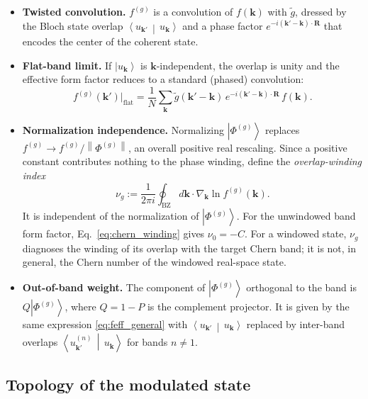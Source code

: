 \documentclass[aps,prb,onecolumn,nofootinbib,superscriptaddress]{revtex4-2}
\newcommand{\mbf}[1]{\mathbf{#1}}
\newcommand{\ket}[1]{\left|#1\right\rangle}
\newcommand{\braket}[2]{\left\langle#1\,\middle|\,#2\right\rangle}
\newcommand{\norm}[1]{\left\lVert#1\right\rVert}
\begin{document}
\begin{itemize}
\item \textbf{Twisted convolution.} $f^{(g)}$ is a convolution of $f(\mbf{k})$ with $\tilde{g}$, dressed by the Bloch state overlap $\braket{u_{\mbf{k}'}}{u_{\mbf{k}}}$ and a phase factor $e^{-i(\mbf{k}'-\mbf{k})\cdot\mbf{R}}$ that encodes the center of the coherent state.

\item \textbf{Flat-band limit.} If $\ket{u_{\mbf{k}}}$ is $\mbf{k}$-independent, the overlap is unity and the effective form factor reduces to a standard (phased) convolution:
\begin{equation}\label{eq:flat_band}
f^{(g)}(\mbf{k}') \big|_{\text{flat}} = \frac{1}{N}\sum_{\mbf{k}} \tilde{g}(\mbf{k}'-\mbf{k})\, e^{-i(\mbf{k}'-\mbf{k})\cdot\mbf{R}}\, f(\mbf{k}).
\end{equation}

\item \textbf{Normalization independence.} Normalizing $\ket{\Phi^{(g)}}$ replaces $f^{(g)} \to f^{(g)}/\norm{\Phi^{(g)}}$, an overall positive real rescaling. Since a positive constant contributes nothing to the phase winding, define the \emph{overlap-winding index}
\begin{equation}\label{eq:Cg}
\nu_g := \frac{1}{2\pi i}\oint_{\mathrm{BZ}} d\mbf{k}\cdot\nabla_{\mbf{k}}\ln f^{(g)}(\mbf{k}) .
\end{equation}
It is independent of the normalization of $\ket{\Phi^{(g)}}$.  For the unwindowed band form factor, Eq.~\eqref{eq:chern_winding} gives $\nu_0=-C$.  For a windowed state, $\nu_g$ diagnoses the winding of its overlap with the target Chern band; it is not, in general, the Chern number of the windowed real-space state.

\item \textbf{Out-of-band weight.} The component of $\ket{\Phi^{(g)}}$ orthogonal to the band is $Q\ket{\Phi^{(g)}}$, where $Q = 1 - P$ is the complement projector. It is given by the same expression \eqref{eq:feff_general} with $\braket{u_{\mbf{k}'}}{u_{\mbf{k}}}$ replaced by inter-band overlaps $\braket{u^{(n)}_{\mbf{k}'}}{u_{\mbf{k}}}$ for bands $n \neq 1$.
\end{itemize}

\subsection{Topology of the modulated state}
\label{sec:topology}
\end{document}

